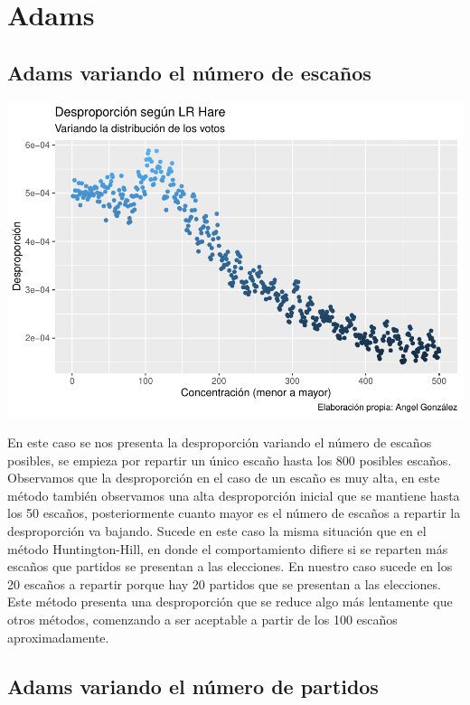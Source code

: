 \documentclass[12pt,a4paper,]{book}
\numberwithin{dummy}{section}
\theoremstyle{ocrenumbox}
\theoremstyle{blacknumex}
\theoremstyle{blacknumbox}
\theoremstyle{ocrenum}
\theoremstyle{ocrenum}
\begin{document}
\hypertarget{adams}{%
\section{Adams}\label{adams}}

\hypertarget{adams-variando-el-nuxfamero-de-escauxf1os}{%
\subsection{Adams variando el número de
escaños}\label{adams-variando-el-nuxfamero-de-escauxf1os}}

\begin{center}\includegraphics[width=0.95\linewidth]{figurasR/unnamed-chunk-43-1} \end{center}

En este caso se nos presenta la desproporción variando el número de
escaños posibles, se empieza por repartir un único escaño hasta los 800
posibles escaños. Observamos que la desproporción en el caso de un
escaño es muy alta, en este método también observamos una alta
desproporción inicial que se mantiene hasta los 50 escaños,
posteriormente cuanto mayor es el número de escaños a repartir la
desproporción va bajando. Sucede en este caso la misma situación que en
el método Huntington-Hill, en donde el comportamiento difiere si se
reparten más escaños que partidos se presentan a las elecciones. En
nuestro caso sucede en los 20 escaños a repartir porque hay 20 partidos
que se presentan a las elecciones. Este método presenta una
desproporción que se reduce algo más lentamente que otros métodos,
comenzando a ser aceptable a partir de los 100 escaños aproximadamente.

\hypertarget{adams-variando-el-nuxfamero-de-partidos}{%
\subsection{Adams variando el número de
partidos}\label{adams-variando-el-nuxfamero-de-partidos}}
\end{document}
